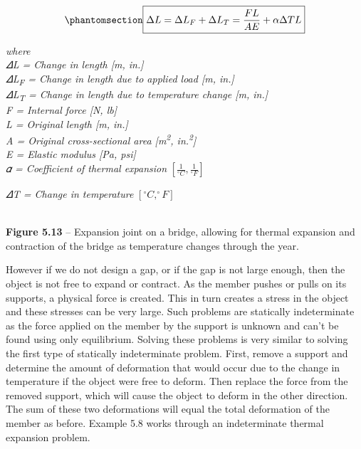 \documentclass[
  letterpaper,
  DIV=11,
  numbers=noendperiod]{scrreprt}
\theoremstyle{definition}
\theoremstyle{remark}
\begin{document}
\begin{equation}\phantomsection\label{eq-5.3}{
\boxed{\Delta L=\Delta L_F+\Delta L_T=\frac{F L}{A E}+\alpha \Delta T L}}\end{equation}

\emph{where}\\
\emph{𝛥L = Change in length {[}m, in.{]}}\\
\emph{𝛥L\textsubscript{F} = Change in length due to applied load {[}m,
in.{]}}\\
\emph{𝛥L\textsubscript{T} = Change in length due to temperature change
{[}m, in.{]}}\\
\emph{F = Internal force {[}N, lb{]}}\\
\emph{L = Original length {[}m, in.{]}}\\
\emph{A = Original cross-sectional area {[}m\textsuperscript{2},
in.\textsuperscript{2}{]}}\\
\emph{E = Elastic modulus {[}Pa, psi{]}}\\
\emph{𝛼 = Coefficient of thermal expansion}
\(\left[\frac{1}{^\circ C}, \frac{1}{^\circ F}\right]\)

\emph{𝛥T = Change in temperature} \([^\circ C, ^\circ F]\)

\strut \\

\textbf{Figure 5.13} -- Expansion joint on a bridge, allowing for
thermal expansion and contraction of the bridge as temperature changes
through the year.

However if we do not design a gap, or if the gap is not large enough,
then the object is not free to expand or contract. As the member pushes
or pulls on its supports, a physical force is created. This in turn
creates a stress in the object and these stresses can be very large.
Such problems are statically indeterminate as the force applied on the
member by the support is unknown and can't be found using only
equilibrium. Solving these problems is very similar to solving the first
type of statically indeterminate problem. First, remove a support and
determine the amount of deformation that would occur due to the change
in temperature if the object were free to deform. Then replace the force
from the removed support, which will cause the object to deform in the
other direction. The sum of these two deformations will equal the total
deformation of the member as before. Example 5.8 works through an
indeterminate thermal expansion problem.
\end{document}

